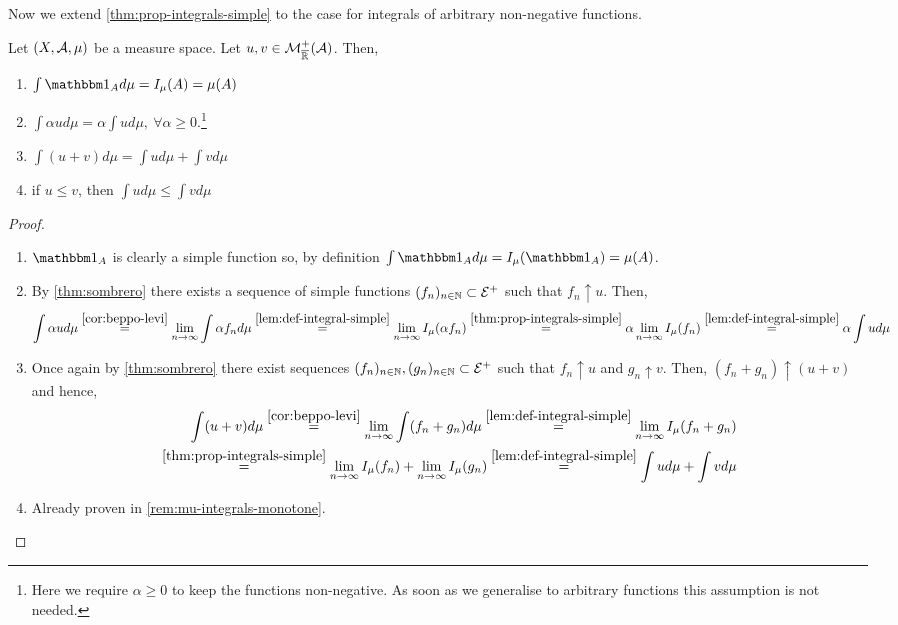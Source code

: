 Now we extend \autoref{thm:prop-integrals-simple} to the case for integrals of arbitrary non-negative functions.

\begin{thm}
	\label{thm:prop-integrals}
	Let $(X, \mathcal{A}, \mu)$ be a measure space. Let $u, v \in \mathcal{M}^+_{\overline{\mathbb{R}}}(\mathcal{A})$. Then,
	\begin{enumerate}
		\item $\int \ind_{A} d\mu = I_\mu(A) = \mu(A)$
		\item $\int \alpha u d\mu = \alpha \int u d\mu,\ \forall \alpha \geq 0$.\footnote{Here we require $\alpha \geq 0$ to keep the functions non-negative. As soon as we generalise to arbitrary functions this assumption is not needed.}
		\item $\int (u + v)d\mu = \int u d\mu + \int v d\mu$
		\item if $u \leq v$, then $\int u d\mu \leq \int v d\mu$
	\end{enumerate}
\end{thm}

\begin{proof}$ $\newline
	\begin{enumerate}
		\item $\ind_A$ is clearly a simple function so, by definition $\int \ind_A d\mu = I_\mu(\ind_A) = \mu(A)$.
		\item By \autoref{thm:sombrero} there exists a sequence of simple functions $(f_n)_{n\in\mathbb{N}} \subset \mathcal{E}^+$ such that $f_n \uparrow u$. Then,
		\begin{align*}
			\int \alpha u d\mu
			\overset{\ref{cor:beppo-levi}}{=} \lim_{n \to \infty} \int \alpha f_n d\mu
		    \overset{\ref{lem:def-integral-simple}}{=} \lim_{n \to \infty} I_\mu(\alpha f_n)
		    \overset{\ref{thm:prop-integrals-simple}}{=} \alpha \lim_{n \to \infty} I_\mu(f_n)
		    \overset{\ref{lem:def-integral-simple}}{=} \alpha \int u d \mu
		\end{align*}
		\item Once again by \autoref{thm:sombrero} there exist sequences $(f_n)_{n\in\mathbb{N}}, (g_n)_{n\in \mathbb{N}} \subset \mathcal{E}^+$ such that $f_n \uparrow u$ and $g_n \uparrow v$. Then, $(f_n + g_n) \uparrow (u + v)$ and hence,
		\begin{align*}
			\int (u + v)d\mu
			\overset{\ref{cor:beppo-levi}}{=} \lim_{n \to \infty}  \int (f_n  + g_n)d\mu
			\overset{\ref{lem:def-integral-simple}}{=} \lim_{n \to \infty} I_\mu(f_n + g_n)\\
			\overset{\ref{thm:prop-integrals-simple}}{=} \lim_{n \to \infty} I_\mu(f_n) + \lim_{n \to \infty} I_\mu(g_n)
			\overset{\ref{lem:def-integral-simple}}{=} \int u d\mu + \int v d\mu
		\end{align*}
		\item Already proven in \autoref{rem:mu-integrals-monotone}.
	\end{enumerate}
\end{proof}

